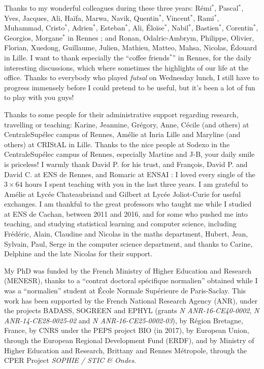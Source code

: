 \begin{acknowledgements}
Thanks to my wonderful colleagues during these three years: Rémi$^*$, Pascal$^*$, Yves, Jacques, Ali, Haïfa, Marwa, Navik, Quentin$^*$, Vincent$^*$, Rami$^*$, Muhammad, Cristo$^*$, Adrien$^*$, Esteban$^*$, Ali, Éloïse$^*$, Nabil$^*$, Bastien$^*$, Corentin$^*$, Georgios, Morgane$^*$ in Rennes ; and Ronan, Odalric-Ambrym, Philippe, Olivier, Florian, Xuedong, Guillaume, Julien, Mathieu, Matteo, Mahsa, Nicolas, Édouard in Lille.
I want to thank especially the ``coffee friends$^*$'' in Rennes, for the daily interesting discussions, which where sometimes the highlights of our life at the office.
%
Thanks to everybody who played \emph{futsal} on Wednesday lunch, I still have to progress immensely before I could pretend to be useful, but it's been a lot of fun to play with you guys!

Thanks to some people for their administrative support regarding research, travelling or teaching: Karine, Jeannine, Grégory, Anne, Cécile (and others) at CentraleSupélec campus of Rennes, Amélie at Inria Lille and Maryline (and others) at CRIStAL in Lille.
Thanks to the nice people at Sodexo in the CentraleSupélec campus of Rennes, especially Martine and J-B, your daily smile is priceless!
I warmly thank David P. for his trust, and François, David P. and David C. at ENS de Rennes, and Romaric at ENSAI : I loved every single of the $3 \times 64$ hours I spent teaching with you in the last three years.
I am grateful to Amélie at Lycée Chateaubriand and Gilbert at Lycée Joliot-Curie for useful exchanges.
%
I am thankful to the great professors who taught me while I studied at ENS de Cachan, between 2011 and 2016, and for some who pushed me into teaching, and studying statistical learning and computer science, including Frédéric, Alain, Claudine and Nicolas in the maths department, Hubert, Jean, Sylvain, Paul, Serge in the computer science department, and thanks to Carine, Delphine and the late Nicolas for their support.


My PhD was funded by the French Ministry of Higher Education and Research (MENESR),
thanks to a ``contrat doctoral spécifique normalien'' obtained while I was a ``normalien'' student at \'Ecole Normale Sup\'erieure de Paris-Saclay.
This work has been supported by
the French National Research Agency (ANR), under the projects BADASS, SOGREEN and EPHYL (grants \emph{N ANR-16-CE40-0002}, \emph{N ANR-14-CE28-0025-02} and \emph{N ANR-16-CE25-0002-03}),
by R\'egion Bretagne, France,
by CNRS under the PEPS project BIO (in 2017),
by European Union, through the European Regional Development Fund (ERDF),
and by Ministry of Higher Education and Research, Brittany and Rennes Métropole, through the CPER Project \emph{SOPHIE / STIC \& Ondes}.



\end{acknowledgements}
